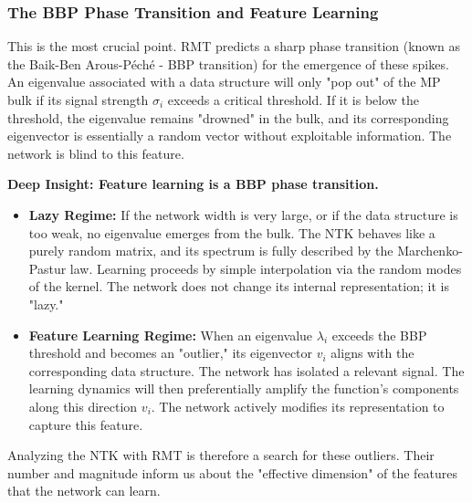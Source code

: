 \documentclass{article}
\begin{document}
\subsubsection{The BBP Phase Transition and Feature Learning}
This is the most crucial point. RMT predicts a sharp phase transition (known as the Baik-Ben Arous-Péché - BBP transition) for the emergence of these spikes. An eigenvalue associated with a data structure will only "pop out" of the MP bulk if its signal strength $\sigma_i$ exceeds a critical threshold. If it is below the threshold, the eigenvalue remains "drowned" in the bulk, and its corresponding eigenvector is essentially a random vector without exploitable information. The network is blind to this feature.

\textbf{Deep Insight: Feature learning is a BBP phase transition.}
\begin{itemize}
    \item \textbf{Lazy Regime:} If the network width is very large, or if the data structure is too weak, no eigenvalue emerges from the bulk. The NTK behaves like a purely random matrix, and its spectrum is fully described by the Marchenko-Pastur law. Learning proceeds by simple interpolation via the random modes of the kernel. The network does not change its internal representation; it is "lazy."
    \item \textbf{Feature Learning Regime:} When an eigenvalue $\lambda_i$ exceeds the BBP threshold and becomes an "outlier," its eigenvector $v_i$ aligns with the corresponding data structure. The network has isolated a relevant signal. The learning dynamics will then preferentially amplify the function's components along this direction $v_i$. The network actively modifies its representation to capture this feature.
\end{itemize}
Analyzing the NTK with RMT is therefore a search for these outliers. Their number and magnitude inform us about the "effective dimension" of the features that the network can learn.
\end{document}
